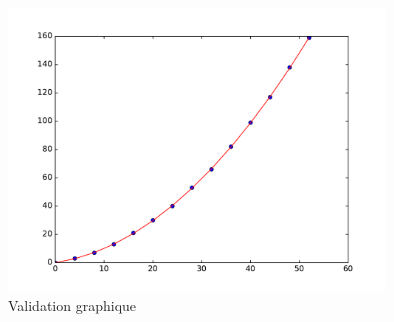 \begin{figure}
 \centering
 \includegraphics[width=10cm]{./Echolesky_1.pdf}
 \caption{Validation graphique}
 \label{fig: Echolesky_2}
\end{figure}

